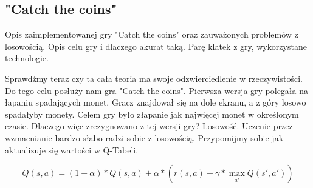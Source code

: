 \documentclass[a4paper,12pt]{article}
\begin{document}
\subsection{"Catch the coins"}

Opis zaimplementowanej gry "Catch the coins" oraz zauważonych problemów z losowością. Opis celu gry i dlaczego akurat taką. Parę klatek z gry, wykorzystane technologie.

Sprawdźmy teraz czy ta cała teoria ma swoje odzwierciedlenie w rzeczywistości. Do tego celu posłuży nam gra "Catch the coins".
Pierwsza wersja gry polegała na łapaniu spadających monet. Gracz znajdował się na dole ekranu, a z góry losowo spadałyby monety. Celem gry było złapanie jak najwięcej monet w określonym czasie. Dlaczego więc zrezygnowano z tej wersji gry? Losowość.
Uczenie przez wzmacnianie bardzo słabo radzi sobie z losowością. Przypomijmy sobie jak aktualizuje się wartości w Q-Tabeli.

\[ Q(s, a) =  (1 - \alpha )*Q(s, a) + \alpha * ( r(s, a) + \gamma * \max_{a'}Q(s', a') )\]
\end{document}
